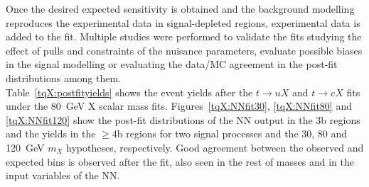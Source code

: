 Once the desired expected sensitivity is obtained and the background modelling reproduces the experimental data in signal-depleted regions, experimental data is added to the fit. Multiple studies were performed to validate the fits studying the effect of pulls and constraints of the nuisance parameters, evaluate possible biases in the signal modelling or evaluating the data/MC agreement in the post-fit distributions among them.\\

Table~\ref{tqX:postfityields} shows the event yields after the $t\to uX$ and $t\to cX$ fits under the 80~GeV X scalar mass fits. Figures~\ref{tqX:NNfit30}, \ref{tqX:NNfit80} and \ref{tqX:NNfit120} show the post-fit distributions of the NN output in the 3b regions and the yields in the $\geq$4b regions for two signal processes and the 30, 80 and 120~GeV $m_X$ hypotheses, respectively. Good agreement between the observed and expected bins is observed after the fit, also seen in the rest of masses and in the input variables of the NN. 

